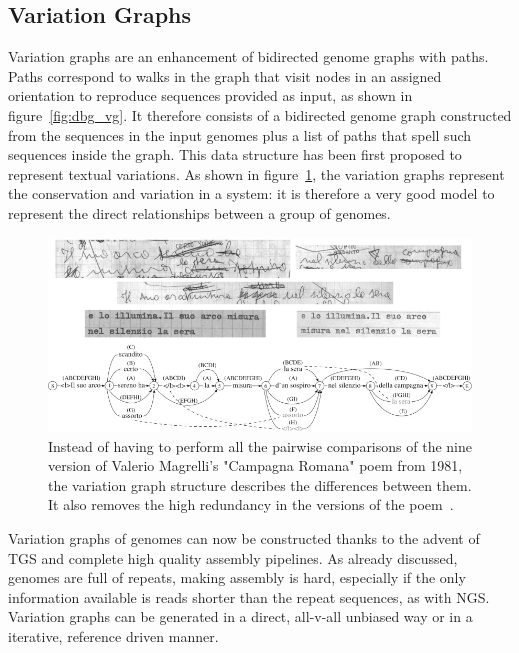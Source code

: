 \subsection{Variation Graphs}
Variation graphs are an enhancement of bidirected genome graphs with paths. Paths correspond to walks in the graph that visit nodes in an assigned orientation to reproduce sequences provided as input, as shown in figure~\ref{fig:dbg_vg}. It therefore consists of a bidirected genome graph constructed from the sequences in the input genomes plus a list of paths that spell such sequences inside the graph.
This data structure has been first proposed to represent textual variations. As shown in figure~\ref{fig:campagna_romana}, the variation graphs represent the conservation and variation in a system: it is therefore a very good model to represent the direct relationships between a group of genomes.
\begin{figure}[H]
	\centering
	\includegraphics[width=.95\linewidth]{figures/background/variant_graph.jpg}
	\caption[The Variation Graph origin.]{Instead of having to perform all the pairwise comparisons of the nine version of Valerio Magrelli's "Campagna Romana" poem from 1981, the variation graph structure describes the differences between them. It also removes the high redundancy in the versions of the poem~\cite{variant_graph,garrison_pangenome}.}
	\label{fig:campagna_romana}
\end{figure}
Variation graphs of genomes can now be constructed thanks to the advent of TGS and complete high quality assembly pipelines. As already discussed, genomes are full of repeats, making assembly is hard, especially if the only information available is reads shorter than the repeat sequences, as with NGS.\\
Variation graphs can be generated in a direct, all-v-all unbiased way or in a iterative, reference driven manner.




